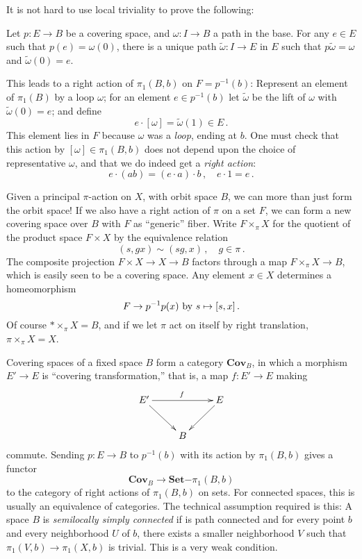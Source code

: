 It is not hard to use local triviality to prove the following:
\begin{theorem}
Let $p:E\to B$ be a covering space, and $\omega:I\to B$ a path in the base.
For any $e\in E$ such that $p(e)=\omega(0)$, there is a unique path 
$\widetilde\omega:I\to E$ in $E$ such that $p\widetilde\omega=\omega$ and
$\widetilde\omega(0)=e$. 
\end{theorem}

This leads to a right action of $\pi_1(B,b)$ on $F=p^{-1}(b)$: Represent an 
element of $\pi_1(B)$ by a loop $\omega$; for an element $e\in p^{-1}(b)$
let $\widetilde\omega$ be the lift of $\omega$ with $\widetilde\omega(0)=e$;
and define 
\[
e\cdot[\omega]=\widetilde\omega(1)\in E\,.
\]
This element lies in $F$ because $\omega$ was a {\em loop}, ending at $b$. 
One must check that this action by $[\omega]\in\pi_1(B,b)$ does not depend 
upon the choice of representative $\omega$, and that we do indeed get a 
{\em right action}:
\[
e\cdot(ab)=(e\cdot a)\cdot b\,,\quad e\cdot1=e\,.
\]

Given a principal $\pi$-action on $X$, with orbit space $B$, 
we can more than just form the orbit space!
If we also have a right action of $\pi$ on a set $F$, we can form a new
covering space over $B$ with $F$ as ``generic'' fiber. 
Write $F\times_\pi X$ for the quotient of the product space $F\times X$ by 
the equivalence relation
\[
(s,gx)\sim(sg,x)\,,\quad g\in\pi\,.
\]
The composite projection $F\times X\to X\to B$ factors through a map
$F\times_\pi X\to B$, which is easily seen to be a covering space. 
Any element $x\in X$ determines a homeomorphism 
\[
F\to p^{-1}p(x)\,\,\hbox{by}\,\, s\mapsto[s,x]\,.
\]
Of course $\ast\times_\pi X=B$, and if we let $\pi$ act on itself by
right translation, $\pi\times_\pi X=X$. 

Covering spaces of a fixed space $B$ form a category $\mathbf{Cov}_B$,
in which a morphism $E'\to E$ is ``covering transformation,'' that is,
a map $f:E'\to E$ making
\[
\xymatrix{
E' \ar[rr]^f \ar[dr] && E \ar[dl] \\
& B
}\]
commute. 
Sending $p:E\to B$ to $p^{-1}(b)$ with its action by $\pi_1(B,b)$ gives
a functor
\[
\mathbf{Cov}_B\to \mathbf{Set}\mathrm{-}\pi_1(B,b)
\]
to the category of right actions of $\pi_1(B,b)$ on sets. For connected
spaces, this is usually an equivalence of categories. The technical
assumption required is this: A space $B$ is {\em semilocally simply 
connected} if is path connected and for every point $b$ and every 
neighborhood $U$ of $b$, there exists a smaller neighborhood $V$ 
such that $\pi_1(V,b)\to\pi_1(X,b)$ is trivial. This is a very weak
condition.

